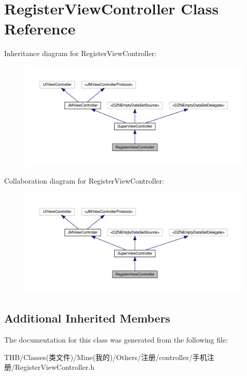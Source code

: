\hypertarget{interface_register_view_controller}{}\section{Register\+View\+Controller Class Reference}
\label{interface_register_view_controller}


Inheritance diagram for Register\+View\+Controller\+:\nopagebreak
\begin{figure}[H]
\begin{center}
\leavevmode
\includegraphics[width=350pt]{interface_register_view_controller__inherit__graph}
\end{center}
\end{figure}


Collaboration diagram for Register\+View\+Controller\+:\nopagebreak
\begin{figure}[H]
\begin{center}
\leavevmode
\includegraphics[width=350pt]{interface_register_view_controller__coll__graph}
\end{center}
\end{figure}
\subsection*{Additional Inherited Members}


The documentation for this class was generated from the following file\+:\begin{DoxyCompactItemize}
\item 
T\+H\+B/\+Classes(类文件)/\+Mine(我的)/\+Others/注册/controller/手机注册/Register\+View\+Controller.\+h\end{DoxyCompactItemize}
